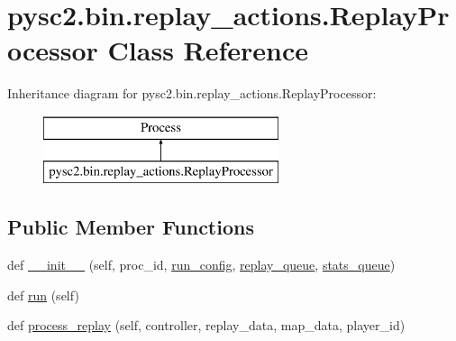 \hypertarget{classpysc2_1_1bin_1_1replay__actions_1_1_replay_processor}{}\section{pysc2.\+bin.\+replay\+\_\+actions.\+Replay\+Processor Class Reference}
\label{classpysc2_1_1bin_1_1replay__actions_1_1_replay_processor}
Inheritance diagram for pysc2.\+bin.\+replay\+\_\+actions.\+Replay\+Processor\+:\begin{figure}[H]
\begin{center}
\leavevmode
\includegraphics[height=2.000000cm]{classpysc2_1_1bin_1_1replay__actions_1_1_replay_processor}
\end{center}
\end{figure}
\subsection*{Public Member Functions}
\begin{DoxyCompactItemize}
\item 
def \mbox{\hyperlink{classpysc2_1_1bin_1_1replay__actions_1_1_replay_processor_a8640877e968c8b982a66f28ce5c3f775}{\+\_\+\+\_\+init\+\_\+\+\_\+}} (self, proc\+\_\+id, \mbox{\hyperlink{classpysc2_1_1bin_1_1replay__actions_1_1_replay_processor_a8903821002ce6c7057910d79cb809cac}{run\+\_\+config}}, \mbox{\hyperlink{classpysc2_1_1bin_1_1replay__actions_1_1_replay_processor_a8d178d30db8f674180796af093c627d1}{replay\+\_\+queue}}, \mbox{\hyperlink{classpysc2_1_1bin_1_1replay__actions_1_1_replay_processor_a078296122e07fc1609673f321cf3f9d1}{stats\+\_\+queue}})
\item 
def \mbox{\hyperlink{classpysc2_1_1bin_1_1replay__actions_1_1_replay_processor_acdd25278568d6e863bf275c38bc50120}{run}} (self)
\item 
def \mbox{\hyperlink{classpysc2_1_1bin_1_1replay__actions_1_1_replay_processor_aa6240fbedbd2a9a742d64c69e61c4922}{process\+\_\+replay}} (self, controller, replay\+\_\+data, map\+\_\+data, player\+\_\+id)
\end{DoxyCompactItemize}
